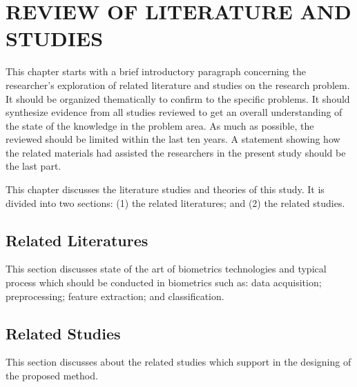\chapter{REVIEW OF LITERATURE AND STUDIES} \label{cap:chapter2}

This chapter starts with a brief introductory paragraph concerning the researcher’s exploration of related literature and studies on the research problem. It should be organized thematically to confirm to the specific problems. It should synthesize evidence from all studies reviewed to get an overall understanding of the state of the knowledge in the problem area. As much as possible, the reviewed should be limited within the last ten years. A statement showing how the related materials had assisted the researchers in the present study should be the last part.  

This chapter discusses the literature studies and theories of this study. It is divided into two sections: (1) the related literatures; and (2) the related studies.

\section{Related Literatures}
This section discusses state of the art of biometrics technologies and typical process which should be conducted in biometrics such as: data acquisition; preprocessing; feature extraction; and classification.

\section{Related Studies}
This section discusses about the related studies which support in the designing of the proposed method.